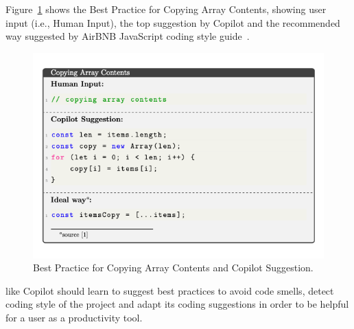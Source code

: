 Figure~\ref{fig:bp_1} shows the Best Practice for Copying Array Contents, showing user input (i.e., Human Input), the top suggestion by Copilot and the recommended way suggested by AirBNB JavaScript coding style guide~\cite{airbnb_code}.

\begin{figure}[hbt!]
    \centering
    \includegraphics[width=\linewidth]{Figures/bp_1.png}
    \caption{Best Practice for Copying Array Contents and Copilot Suggestion.}
    \label{fig:bp_1}
\end{figure}

\cct{} like Copilot should learn to suggest best practices to avoid code smells, detect coding style of the project and adapt its coding suggestions in order to be helpful for a user as a productivity tool. 


